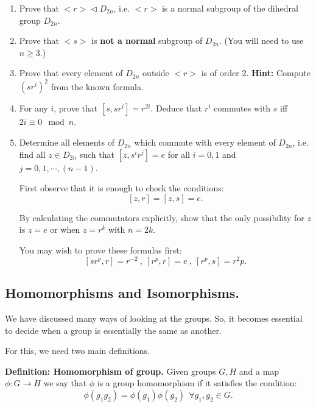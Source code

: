 \documentclass[12pt]{article}
\newcommand{\deff}[1]{{\bf Definition: #1} }
\begin{document}
\begin{enumerate}
\item Prove that $<r> \vartriangleleft D_{2n}$, i.e. $<r>$ is a normal
subgroup of the dihedral group $D_{2n}$.
\item Prove that $<s>$ is {\bf not a normal} subgroup of $D_{2n}$. (You will
need to use $n\geq 3$.)

\item Prove that every element of $D_{2n}$ outside $<r>$ is of order
$2$. {\bf Hint:} Compute $(sr^i)^2$ from the known formula.

\item For any $i$, prove that  $[s,sr^i] = r^{2i}$.
Deduce that $r^i$ commutes with $s$ iff $2i \equiv 0 \mod{n}$.

\item Determine all elements of $D_{2n}$ which commute with every
element of $D_{2n}$, i.e. find all $z\in D_{2n}$ such that $[z,s^ir^j]=e$
for all $i=0,1$ and $j=0,1,\cdots,(n-1)$.

First observe that it is enough to check the conditions:
$$[z,r]=[z,s]=e.$$

By calculating the commutators explicitly, show that the only
possibility for $z$ is $z=e$ or when $z=r^k$ with $n=2k$.

You may wish to prove these formulas first:
$$[sr^p,r] = r^{-2}~,~ [r^p,r]=e~,~[r^p,s]=r^2p.$$


\end{enumerate}
\subsection{Homomorphisms and Isomorphisms.}
We have discussed many ways of looking at the groups. So, it becomes
essential to decide when a group is essentially the same as another.

For this, we need two main definitions.

\deff{Homomorphism of  group.}
Given groups $G,H$ and a map $\phi :G\rightarrow H$ we say that $\phi$ is a
group homomorphism if it satisfies the condition:
$$\phi(g_1g_2) = \phi(g_1)\phi(g_2)~~\forall g_1,g_2\in G.$$
\end{document}
